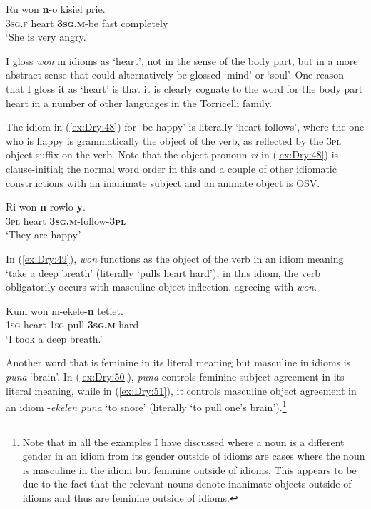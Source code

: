 \documentclass[output=collectionpaper]{langsci/langscibook}
\begin{document}
\ea \label{ex:Dry:47}
\gll Ru	won	\textbf{n}-o	kisiel	prie.\\
\textsc{3sg.f} heart \textbf{\textsc{3sg.m}}-be fast completely\\
\glt `She is very angry.'
\z

I gloss \textit{won} in idioms as `heart', not in the sense of the body part, but in a more abstract sense that could alternatively be glossed `mind' or `soul'. One reason that I gloss it as `heart' is that it is clearly cognate to the word for the body part heart in a number of other languages in the Torricelli family.

The idiom in (\ref{ex:Dry:48}) for `be happy' is literally `heart follows', where the one who is happy is grammatically the object of the verb, as reflected by the \textsc{3pl} object suffix on the verb. Note that the object pronoun \textit{ri} in (\ref{ex:Dry:48}) is clause-initial; the normal word order in this and a couple of other idiomatic constructions with an inanimate subject and an animate object is OSV.

\ea    \label{ex:Dry:48}
\gll Ri	won	\textbf{n}-rowlo-\textbf{y}.\\
\textsc{3pl} heart \textbf{\textsc{3sg.m}}-follow-\textbf{\textsc{3pl}}\\
\glt `They are happy.'
\z

In (\ref{ex:Dry:49}), \textit{won} functions as the object of the verb in an idiom meaning `take a deep breath' (literally `pulls heart hard'); in this idiom, the verb obligatorily occurs with masculine object inflection, agreeing with \textit{won}.

\ea \label{ex:Dry:49}
\gll Kum	won	m-ekele-\textbf{n}	tetiet.\\
\textsc{1sg} heart \textsc{1sg}-pull-\textbf{\textsc{3sg.m}} hard\\
\glt `I took a deep breath.'
\z

Another word that is feminine in its literal meaning but masculine in idioms is \textit{puna} `brain'. In (\ref{ex:Dry:50}), \textit{puna} controls feminine subject agreement in its literal meaning, while in (\ref{ex:Dry:51}), it controls masculine object agreement in an idiom -\textit{ekelen puna} `to snore' (literally `to pull one's brain').\footnote{Note that in all the examples I have discussed where a noun is a different gender in an idiom from its gender outside of idioms are cases where the noun is masculine in the idiom but feminine outside of idioms. This appears to be due to the fact that the relevant nouns denote inanimate objects outside of idioms and thus are feminine outside of idioms.}
\end{document}
